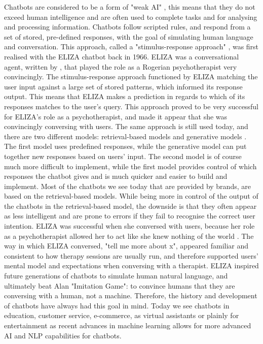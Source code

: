 Chatbots are considered to be a form of "weak AI" \citep{DeAngeli2008}, this means that they do not exceed human intelligence and are often used to complete tasks and for analysing and processing information. Chatbots follow scripted rules, and respond from a set of stored, pre-defined responses, with the goal of simulating human language and conversation. This approach, called a "stimulus-response approach" \citep[: 57]{McTear2016b}, was first realised with the ELIZA chatbot back in 1966. ELIZA was a conversational agent, written by \cite{Weizenbaum1966}, that played the role as a Rogerian psychotherapist very convincingly. The stimulus-response approach functioned by ELIZA matching the user input against a large set of stored patterns, which informed its response output. This means that ELIZA makes a prediction in regards to which of its responses matches to the user's query. This approach proved to be very successful for ELIZA's role as a psychotherapist, and made it appear that she was convincingly conversing with users. The same approach is still used today, and there are two different models: retrieval-based models and generative models \citep{Kothari2016}. The first model uses predefined responses, while the generative model can put together new responses based on users' input. The second model is of course much more difficult to implement, while the first model provides control of which responses the chatbot gives and is much quicker and easier to build and implement. Most of the chatbots we see today that are provided by brands, are based on the retrieval-based models. While being more in control of the output of the chatbots in the retrieval-based model, the downside is that they often appear as less intelligent and are prone to errors if they fail to recognise the correct user intention. ELIZA was successful when she conversed with users, because her role as a psychotherapist allowed her to act like she knew nothing of the world \citep{Weizenbaum1966}. The way in which ELIZA conversed, "tell me more about x", appeared familiar and consistent to how therapy sessions are usually run, and therefore supported users' mental model and expectations when conversing with a therapist. ELIZA inspired future generations of chatbots to simulate human natural language, and ultimately beat Alan \cite{Turing1950} "Imitation Game": to convince humans that they are conversing with a human, not a machine. Therefore, the history and development of chatbots have always had this goal in mind. Today we see chatbots in education, customer service, e-commerce, as virtual assistants or plainly for entertainment as recent advances in machine learning allows for more advanced AI and NLP capabilities for chatbots.

